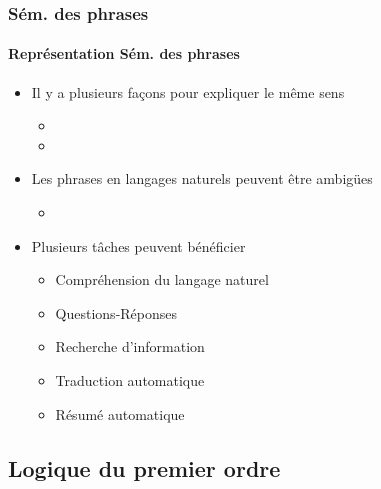 \documentclass[xcolor=table]{beamer}
\begin{document}
\begin{frame}
	\frametitle{Sém. des phrases}
	\framesubtitle{Représentation Sém. des phrases}
	
	\begin{itemize}
		\item Il y a plusieurs façons pour expliquer le même sens
		\begin{itemize}
			\item {}
			\item {}
		\end{itemize}
	
		\item Les phrases en langages naturels peuvent être ambigües
		\begin{itemize}
			\item {}
		\end{itemize}
	
		\item Plusieurs tâches peuvent bénéficier 
		\begin{itemize}
			\item Compréhension du langage naturel
			\item Questions-Réponses
			\item Recherche d'information
			\item Traduction automatique
			\item Résumé automatique
		\end{itemize}
	\end{itemize}
	
\end{frame}

\subsection{Logique du premier ordre}
\end{document}
